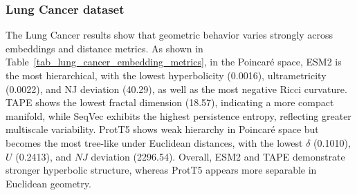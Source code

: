 \documentclass[]{Liebert_Author_revised}
\begin{document}

\subsubsection{Lung Cancer dataset}

The Lung Cancer results show that geometric behavior varies strongly across embeddings and distance metrics. As shown in Table~\ref{tab_lung_cancer_embedding_metrics}, in the Poincaré space, ESM2 is the most hierarchical, with the lowest hyperbolicity (0.0016), ultrametricity (0.0022), and NJ deviation (40.29), as well as the most negative Ricci curvature. TAPE shows the lowest fractal dimension (18.57), indicating a more compact manifold, while SeqVec exhibits the highest persistence entropy, reflecting greater multiscale variability. ProtT5 shows weak hierarchy in Poincaré space but becomes the most tree-like under Euclidean distances, with the lowest $\delta$ (0.1010), $U$ (0.2413), and $NJ$ deviation (2296.54). Overall, ESM2 and TAPE demonstrate stronger hyperbolic structure, whereas ProtT5 appears more separable in Euclidean geometry.
\end{document}
